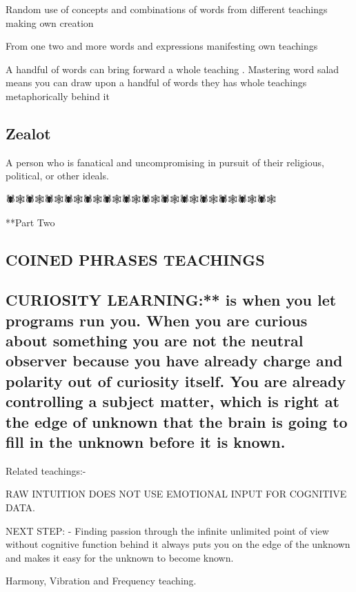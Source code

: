 Random use of concepts and combinations of words from different
teachings making own creation

From one two and more words and expressions manifesting own teachings

A handful of words can bring forward a whole teaching . Mastering word
salad means you can draw upon a handful of words they has whole
teachings metaphorically behind it

\subsection{Zealot}\label{zealot}

A person who is fanatical and uncompromising in pursuit of their
religious, political, or other ideals.

🕷🕸🕷🕸🕷🕸🕷🕸🕷🕸🕷🕸🕷🕸🕷🕸🕷🕸🕷🕸🕷🕸🕷🕸🕷🕸🕷🕸

**Part Two

\subsection{COINED PHRASES TEACHINGS}\label{coined-phrases-teachings}

\subsection{CURIOSITY LEARNING:** is when you let programs run you. When
you are curious about something you are not the neutral observer because
you have already charge and polarity out of curiosity itself. You are
already controlling a subject matter, which is right at the edge of
unknown that the brain is going to fill in the unknown before it is
known.}\label{curiosity-learning-is-when-you-let-programs-run-you.-when-you-are-curious-about-something-you-are-not-the-neutral-observer-because-you-have-already-charge-and-polarity-out-of-curiosity-itself.-you-are-already-controlling-a-subject-matter-which-is-right-at-the-edge-of-unknown-that-the-brain-is-going-to-fill-in-the-unknown-before-it-is-known.}

Related teachings:-

RAW INTUITION DOES NOT USE EMOTIONAL INPUT FOR COGNITIVE DATA.

NEXT STEP: - Finding passion through the infinite unlimited point of
view without cognitive function behind it always puts you on the edge of
the unknown and makes it easy for the unknown to become known.

Harmony, Vibration and Frequency teaching.

